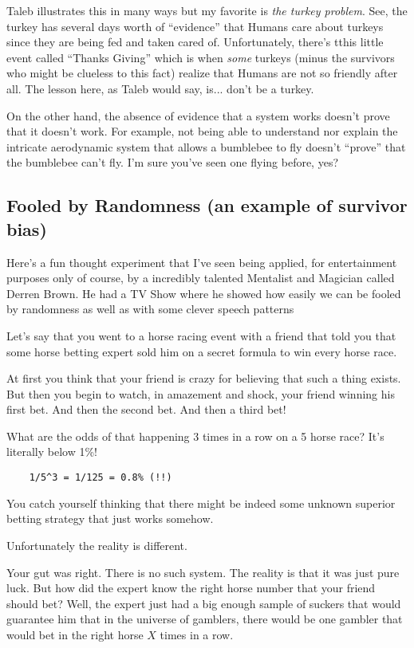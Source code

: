 \documentclass{article}
\begin{document}
Taleb illustrates this in many ways but my favorite is \emph{the turkey problem}. See, the turkey has several days worth of ``evidence'' that Humans care about turkeys since they are being fed and taken cared of. Unfortunately, there's tthis little event called ``Thanks Giving'' which is when \textit{some} turkeys (minus the survivors who might be clueless to this fact) realize that Humans are not so friendly after all. 
The lesson here, as Taleb would say, is... don't be a turkey.

On the other hand, the absence of evidence that a system works doesn't prove that it doesn't work. For example, not being able to understand nor explain the intricate aerodynamic system that allows a bumblebee to fly doesn't ``prove'' that the bumblebee can't fly. I'm sure you've seen one flying before, yes?

\subsection{Fooled by Randomness (an example of survivor bias)}

Here's a fun thought experiment that I've seen being applied, for entertainment purposes only of course, by a incredibly talented Mentalist and Magician called Derren Brown. He had a TV Show where he showed how easily we can be fooled by randomness as well as with some clever speech patterns

Let's say that you went to a horse racing event with a friend that told you that some horse betting expert sold him on a secret formula to win every horse race. 

At first you think that your friend is crazy for believing that such a thing exists.
But then you begin to watch, in amazement and shock, your friend winning his first bet. And then the second bet. And then a third bet! 

What are the odds of that happening 3 times in a row on a 5 horse race? It's literally below 1\%!

\begin{lstlisting}
	1/5^3 = 1/125 = 0.8% (!!)
\end{lstlisting}

You catch yourself thinking that there might be indeed some unknown superior betting strategy that just works somehow.

Unfortunately the reality is different.

Your gut was right. There is no such system. The reality is that it was just pure luck. 
But how did the expert know the right horse number that your friend should bet? 
Well, the expert just had a big enough sample of suckers that would guarantee him that in the universe of gamblers, there would be one gambler that would bet in the right horse $X$ times in a row. 
\end{document}
